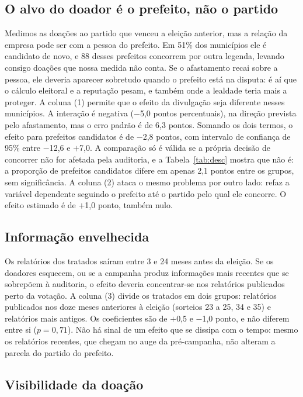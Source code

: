 \subsection{O alvo do doador é o prefeito, não o partido}

Medimos as doações ao partido que venceu a eleição
anterior, mas a relação da empresa pode ser com a pessoa do prefeito. Em 51\% dos municípios ele é
candidato de novo, e 88 desses prefeitos concorrem por outra legenda, levando consigo doações que nossa
medida não conta. Se o afastamento recai sobre a pessoa, ele deveria aparecer sobretudo quando o prefeito
está na disputa: é aí que o cálculo eleitoral e a reputação pesam, e também onde a lealdade teria mais a
proteger. A coluna (1) permite que o efeito da divulgação seja diferente nesses municípios. A interação
é negativa ($-$5,0 pontos percentuais), na direção prevista pelo afastamento, mas o erro padrão é de 6,3
pontos. Somando os dois termos, o efeito para prefeitos candidatos é de $-$2,8 pontos, com intervalo de
confiança de 95\% entre $-$12,6 e $+$7,0. A comparação só é válida se a própria decisão de concorrer não
for afetada pela auditoria, e a Tabela~\ref{tab:desc} mostra que não é: a proporção de prefeitos
candidatos difere em apenas 2,1 pontos entre os grupos, sem significância. A coluna (2) ataca o mesmo
problema por outro lado: refaz a variável dependente seguindo o prefeito até o partido pelo qual ele
concorre. O efeito estimado é de $+$1,0 ponto, também nulo.

\subsection{Informação envelhecida}

Os relatórios dos tratados saíram entre 3 e 24 meses antes da eleição.
Se os doadores esquecem, ou se a campanha produz informações mais recentes que se sobrepõem à auditoria, o
efeito deveria concentrar-se nos relatórios publicados perto da votação. A coluna (3) divide os tratados
em dois grupos: relatórios publicados nos doze meses anteriores à eleição (sorteios 23 a 25, 34 e 35) e
relatórios mais antigos. Os coeficientes são de $+$0,5 e $-$1,0 ponto, e não diferem entre si
($p=0{,}71$). Não há sinal de um efeito que se dissipa com o tempo: mesmo os relatórios recentes, que
chegam no auge da pré-campanha, não alteram a parcela do partido do prefeito.

\subsection{Visibilidade da doação}

